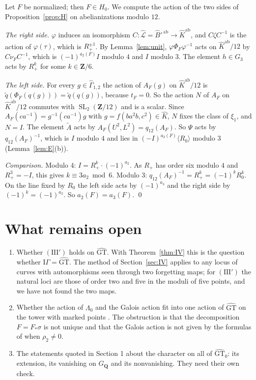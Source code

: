 \documentclass[11pt,a4paper]{article}
\theoremstyle{plain}
\theoremstyle{definition}
\theoremstyle{remark}
\newcommand{\GT}{\widehat{\mathrm{GT}}}
\newcommand{\GTz}{\widehat{\mathrm{GT}}_0}
\newcommand{\Z}{\mathbf Z}
\newcommand{\GQ}{G_{\mathbf Q}}
\newcommand{\Bh}{\widehat B}
\newcommand{\Gh}{\widehat\Gamma}
\newcommand{\SL}{\operatorname{SL}}
\newcommand{\ab}{\mathrm{ab}}
\begin{document}
Let $F$ be normalized; then $F\in H_0$. We compute the action of the two sides of Proposition~\ref{prop:H} on
abelianizations modulo $12$.

\emph{The right side.} $\varphi$ induces an isomorphism $C:\widehat{\mathcal L}=\Bh'^{\,\ab}\to\widehat K^{\ab}$, and
$C\zeta C^{-1}$ is the action of $\varphi(\tau)$, which is $R_+^{\pm1}$. By Lemma~\ref{lem:unit},
$\varphi\Phi_F\varphi^{-1}$ acts on $\widehat K^{\ab}/12$ by $C\nu_FC^{-1}$, which is $(-1)^{a_2(F)}I$ modulo $4$ and
$I$ modulo $3$. The element $h\in G_3$ acts by $R_+^k$ for some $k\in\Z/6$.

\emph{The left side.} For every $g\in\Gh_{1,2}$ the action of $A_F(g)$ on $\widehat K^{\ab}/12$ is
$\tilde q(\Phi_F(q(g)))=\tilde q(q(g))$, because $t_F=0$. So the action $N$ of $A_F$ on $\widehat K^{\ab}/12$
commutes with $\SL_2(\Z/12)$ and is a scalar. Since $A_F(ca^{-1})=g^{-1}(ca^{-1})g$ with
$g=f(ba^2b,c^2)\in\widehat K$, $N$ fixes the class of $\xi_1$, and $N=I$. The element $\tilde A$ acts by
$A_F(U^2,L^2)=q_{12}(A_F)$. So $\Psi$ acts by $q_{12}(A_F)^{-1}$, which is $I$ modulo $4$ and lies in
$(-I)^{a_3(F)}\langle R_0\rangle$ modulo $3$ (Lemma~\ref{lem:E}(b)).

\emph{Comparison.} Modulo $4$: $I=R_+^k\cdot(-1)^{a_2}$. As $R_+$ has order six modulo $4$ and $R_+^3=-I$, this
gives $k\equiv3a_2\bmod6$. Modulo $3$: $q_{12}(A_F)^{-1}=R_+^k=(-1)^kR_0^k$. On the line fixed by $R_0$ the left
side acts by $(-1)^{a_3}$ and the right side by $(-1)^k=(-1)^{a_2}$. So $a_2(F)=a_3(F)$. \qed

\section{What remains open}

\begin{enumerate}
\item Whether $(\mathrm{III}')$ holds on $\GT$. With Theorem~\ref{thm:IV} this is the question whether
$\mathrm{I}\Gamma=\GT$. The method of Section~\ref{sec:IV} applies to any locus of curves with automorphisms seen
through two forgetting maps; for $(\mathrm{III}')$ the natural loci are those of order two and five in the moduli
of five points, and we have not found the two maps.
\item Whether the action of $\Lambda_0$ and the Galois action fit into one action of $\GT$ on the tower with
marked points \cite[\S8]{LNS}. The obstruction is that the decomposition $F=F_*\sigma$ is not unique and that the
Galois action is not given by the formulas of \cite{HLS} when $\rho_2\ne0$.
\item The statements quoted in Section 1 about the character on all of $\GTz$: its extension, its vanishing on
$\GQ$ and its nonvanishing. They need their own check.
\end{enumerate}
\end{document}
